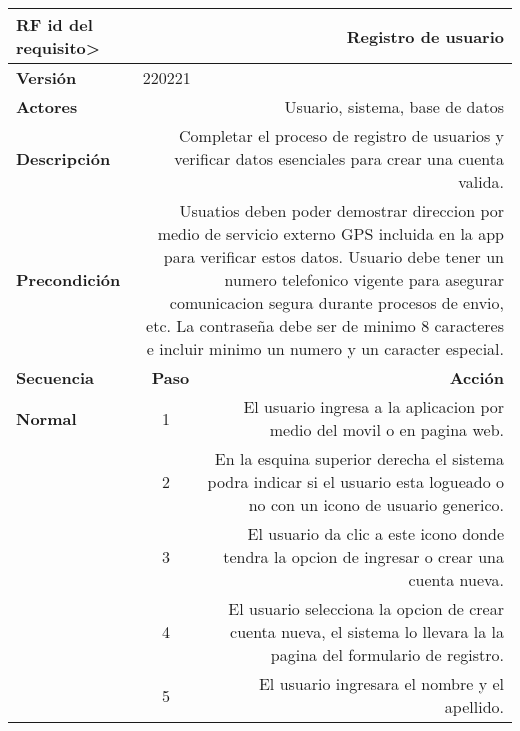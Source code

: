 \documentclass[conference]{IEEEtran}
\begin{document}
\begin{table}[H]
  \centering
  \begin{adjustbox}{width=0.47\textwidth}
    \begin{tabular}{|p{11.215em}|r|r|}
    \toprule
    \textbf{RF id del requisito>} & \multicolumn{2}{p{37.43em}|}{\textbf{Registro de usuario}} \\
    \midrule
    \textbf{Versión} & \multicolumn{2}{l|}{220221} \\
    \midrule
    \textbf{Actores} & \multicolumn{2}{p{37.43em}|}{Usuario, sistema, base de datos} \\
    \midrule
    \textbf{Descripción} & \multicolumn{2}{p{37.43em}|}{Completar el proceso de registro de usuarios y verificar datos esenciales para crear una cuenta valida.} \\
    \midrule
    \textbf{Precondición} & \multicolumn{2}{p{37.43em}|}{Usuatios deben poder demostrar direccion por medio de servicio externo GPS incluida en la app para verificar estos datos. Usuario debe tener un numero telefonico vigente para asegurar comunicacion segura durante procesos de envio, etc. La contraseña debe ser de minimo 8 caracteres e incluir minimo un numero y un caracter especial.} \\
    \midrule
    \textbf{Secuencia} & \textbf{Paso} & \multicolumn{1}{p{32em}|}{\textbf{Acción}} \\
    \midrule
    \textbf{Normal} & \multicolumn{1}{c|}{1} & \multicolumn{1}{p{32em}|}{El usuario ingresa a la aplicacion por medio del movil o en pagina web.} \\
    \midrule
    \multicolumn{1}{|r|}{} & \multicolumn{1}{c|}{2} & \multicolumn{1}{p{32em}|}{En la esquina superior derecha el sistema podra indicar si el usuario esta logueado o no con un icono de usuario generico.} \\
    \midrule
    \multicolumn{1}{|r|}{} & \multicolumn{1}{c|}{3} & \multicolumn{1}{p{32em}|}{El usuario da clic a este icono donde tendra la opcion de ingresar o crear una cuenta nueva.} \\
    \midrule
    \multicolumn{1}{|r|}{} & \multicolumn{1}{c|}{4} & \multicolumn{1}{p{32em}|}{El usuario selecciona la opcion de crear cuenta nueva, el sistema lo llevara la la pagina del formulario de registro.} \\
    \midrule
    \multicolumn{1}{|r|}{} & \multicolumn{1}{c|}{5} & \multicolumn{1}{p{32em}|}{El usuario ingresara el nombre y el apellido.} \\

\end{tabular}
\end{adjustbox}
\end{table}
\end{document}
